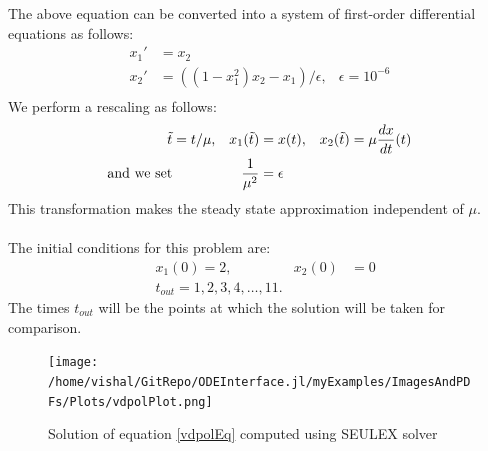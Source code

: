 \documentclass[notitlepage,12pt]{article}
\begin{document}
The above equation can be converted into a system of first-order differential equations as follows:
\begin{equation}
\begin{aligned}
	x_1' &= x_2\\
	x_2' &= \left(\left(1-x_1^2\right)x_2-x_1\right)/\epsilon, &\epsilon = 10^{-6}\\
\end{aligned}
\end{equation}
We perform a rescaling as follows:
\begin{equation}
\begin{aligned}
\tilde{t} &= t/\mu, &x_1(\tilde{t})&=x(t), &x_2(\tilde{t})=\mu \frac{dx}{dt}(t)\\
\textnormal{and we set}& &\frac{1}{\mu^2} &= \epsilon
\end{aligned}
\end{equation}
This transformation makes the steady state approximation independent of $\mu$.\\ \\
The initial conditions for this problem are:
\begin{equation}
\begin{aligned}
&x_1(0) =2, &x_2(0)&= 0\\
&t_{out} =1,2,3,4,\ldots,11.
\end{aligned}
\end{equation}
The times $t_{out}$ will be the points at which the solution will be taken for comparison.

\begin{figure}[H]
\centering
\texttt{[image: /home/vishal/GitRepo/ODEInterface.jl/myExamples/ImagesAndPDFs/Plots/vdpolPlot.png]}
\caption{Solution of equation \eqref{vdpolEq} computed using SEULEX solver}
\label{vdpolPlot}
\end{figure}

\end{document}
